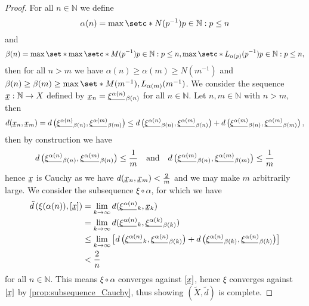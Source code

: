 \begin{proof}
    For all \(n \in \mathbb{N}\) we define
    \begin{equation*}
        \alpha(n) = \max{\setc*{N(p^{-1})}{p \in \mathbb{N} : p \leq n}}
    \end{equation*}
    and
    \begin{equation*}
        \beta(n) = \max{\set*{\max{\setc*{M(p^{-1})}{p \in \mathbb{N} : p \leq n}}, \max{\setc*{L_{\alpha(p)}(p^{-1})}{p \in \mathbb{N} : p \leq n}}} },
    \end{equation*}
    then for all \(n > m\) we have \(\alpha(n) \geq \alpha(m) \geq N(m^{-1})\) and \(\beta(n) \geq \beta(m) \geq \max\set*{M(m^{-1}), L_{\alpha(m)}(m^{-1})}\). We consider the sequence \(\sequnder{x} : \mathbb{N} \to X\) defined by \(\sequnder{x}_n = \sequnder{\xi^{\alpha(n)}}_{\beta(n)}\) for all \(n \in \mathbb{N}\). Let \(n, m \in \mathbb{N}\) with \(n > m\), then
    \begin{equation*}
        d(\sequnder{x}_{n}, \sequnder{x}_{m}) = d\left(\sequnder{\xi^{\alpha(n)}}_{\beta(n)}, \sequnder{\xi^{\alpha(m)}}_{\beta(m)}\right) \leq d\left(\sequnder{\xi^{\alpha(n)}}_{\beta(n)}, \sequnder{\xi^{\alpha(m)}}_{\beta(n)}\right) + d\left(\sequnder{\xi^{\alpha(m)}}_{\beta(n)}, \sequnder{\xi^{\alpha(m)}}_{\beta(m)}\right),
    \end{equation*}
    then by construction we have
    \begin{equation*}
        d\left(\sequnder{\xi^{\alpha(n)}}_{\beta(n)}, \sequnder{\xi^{\alpha(m)}}_{\beta(n)}\right) \leq \frac1m
        \quad\text{and}\quad
        d\left(\sequnder{\xi^{\alpha(m)}}_{\beta(n)}, \sequnder{\xi^{\alpha(m)}}_{\beta(m)}\right) \leq \frac1m
    \end{equation*}
    hence \(\sequnder{x}\) is Cauchy as we have \(d(\sequnder{x}_n, \sequnder{x}_m) < \frac2m\) and we may make \(m\) arbitrarily large. We consider the subsequence \(\xi \circ \alpha\), for which we have
    \begin{align*}
        \tilde{d}\left(\xi(\alpha(n)), [\sequnder{x}]\right)
        &= \lim_{k \to \infty} d(\sequnder{\xi^{\alpha(n)}}_{k}, \sequnder{x}_k)\\
        &= \lim_{k\to\infty} d(\sequnder{\xi^{\alpha(n)}}_k, \sequnder{\xi^{\alpha(k)}}_{\beta(k)})\\
        &\leq \lim_{k\to\infty}\left[d\left(\sequnder{\xi^{\alpha(n)}}_k, \sequnder{\xi^{\alpha(n)}}_{\beta(k)}\right) + d\left(\sequnder{\xi^{\alpha(n)}}_{\beta(k)}, \sequnder{\xi^{\alpha(n)}}_{\beta(k)}\right)\right]\\
        &< \frac{2}{n}
    \end{align*}
    for all \(n \in \mathbb{N}\). This means \(\xi \circ \alpha\) converges against \([\sequnder{x}]\), hence \(\xi\) converges against \([\sequnder{x}]\) by \cref{prop:subsequence_Cauchy}, thus showing \((\tilde{X}, \tilde{d})\) is complete.


\end{proof}
